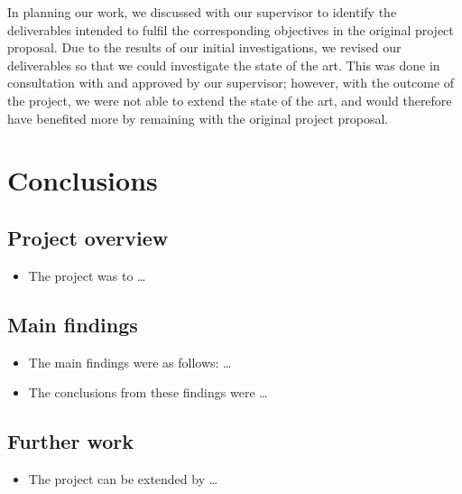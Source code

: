 \documentclass[12pt,a4paper]{article}
\begin{document}
In planning our work, we discussed with our supervisor to identify the deliverables intended to fulfil the corresponding objectives in the original project proposal. Due to the results of our initial investigations, we revised our deliverables so that we could investigate the state of the art. This was done in consultation with and approved by our supervisor; however, with the outcome of the project, we were not able to extend the state of the art, and would therefore have benefited more by remaining with the original project proposal. 

\section{Conclusions}
\subsection{Project overview}
\begin{itemize}
    \item The project was to \dots
\end{itemize}

\subsection{Main findings}
\begin{itemize}
    \item The main findings were as follows: \dots
    \item The conclusions from these findings were \dots
\end{itemize}

\subsection{Further work}
\begin{itemize}
    \item The project can be extended by \dots
\end{itemize}


\end{document}
